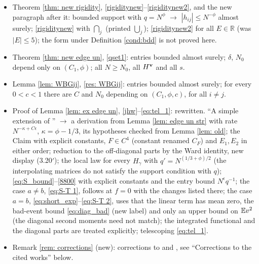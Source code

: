 \begin{itemize}
\item Theorem \ref{thm: new rigidity}, \eqref{rigiditynew}--\eqref{rigiditynew2}, and the new paragraph after it: bounded support with $q=N^\phi$ $\to$ $|h_{ij}|\le N^{-\phi}$ almost surely; \eqref{rigiditynew} with $\bigcap_j$ (printed $\bigcup_j$); \eqref{rigiditynew2} for all $E\in\mathbb R$ (was $|E|\le5$); the form under Definition \ref{cond:bdd} is not proved here.
\item Theorem \ref{thm: new edge un}, \eqref{qset1}: entries bounded almost surely; $\delta$, $N_0$ depend only on $(C_1,\phi)$; all $N\ge N_0$, all $H^{\mathbf{v}}$ and all $s$.
\item Lemma \ref{lem: WBGij}, \eqref{res: WBGij}: entries bounded almost surely; for every $0<c<1$ there are $C$ and $N_0$ depending on $(C_1,\phi,c)$, for all $i\ne j$.
\item Proof of Lemma \ref{lem: ex edge un}, \eqref{jhw}--\eqref{eq:tel_1}: rewritten. ``A simple extension of \cite[Theorem 2.7]{EKYY2}'' $\to$ a derivation from Lemma \ref{lem: edge un str} with rate $N^{-\kappa+C\epsilon}$, $\kappa=\phi-1/3$, its hypotheses checked from Lemma \ref{lem: old}; the Claim with explicit constants, $F\in C^4$ (constant renamed $C_F$) and $E_1,E_2$ in either order; reduction to the off-diagonal parts by the Ward identity, new display (3.20$'$); the local law for every $H_\gamma$ with $q'=N^{(1/3+\phi)/2}$ (the interpolating matrices do not satisfy the support condition with $q$); \eqref{eq:S_bound}--\eqref{8800} with explicit constants and the entry bound $N^{\epsilon}q^{-1}$; the case $a\ne b$, \eqref{eq:S-T 1}, follows \cite[(6.41)--(6.97)]{EKYY2} at $f=0$ with the changes listed there; the case $a=b$, \eqref{eq:short_exp}--\eqref{eq:S-T 2}, uses that the linear term has mean zero, the bad-event bound \eqref{eq:diag_bad} (new label) and only an upper bound on $\mathbb{E} v^2$ (the diagonal second moments need not match); the integrated functional and the diagonal parts are treated explicitly; telescoping \eqref{eq:tel_1}.
\item Remark \ref{rem: corrections} (new): corrections to \cite{EKYY1} and \cite{EKYY2}, see ``Corrections to the cited works'' below.
\end{itemize}

